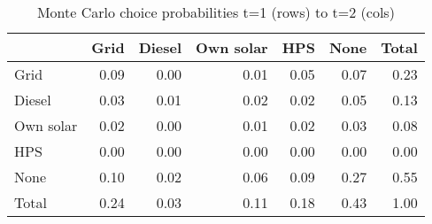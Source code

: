 \begin{table}[!ht]
	\centering
		\caption{Monte Carlo choice probabilities t=1 (rows) to t=2 (cols)}
\begin{tabular}{lrrrrrr}
		\toprule
               &      Grid&    Diesel& Own solar&       HPS&      None&     Total\\
		\midrule
		           Grid&      0.09&      0.00&      0.01&      0.05&      0.07&      0.23\\
		         Diesel&      0.03&      0.01&      0.02&      0.02&      0.05&      0.13\\
		      Own solar&      0.02&      0.00&      0.01&      0.02&      0.03&      0.08\\
		            HPS&      0.00&      0.00&      0.00&      0.00&      0.00&      0.00\\
		           None&      0.10&      0.02&      0.06&      0.09&      0.27&      0.55\\
		          Total&      0.24&      0.03&      0.11&      0.18&      0.43&      1.00\\
		\bottomrule
	\end{tabular}
\end{table}
